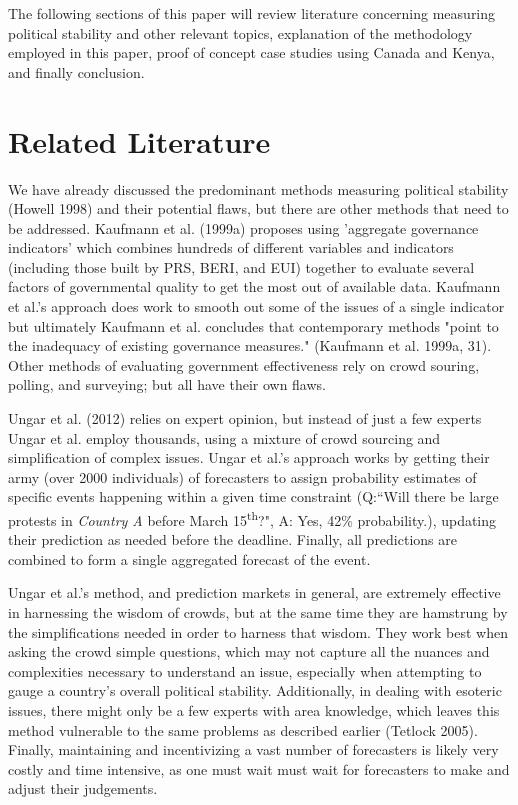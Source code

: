\documentclass[12pt]{article}
\begin{document}
\begin{spacing}{1.5}
The following sections of this paper will review literature concerning measuring political stability and other relevant topics, explanation of the methodology employed in this paper, proof of concept case studies using Canada and Kenya, and finally conclusion. 

\section*{Related Literature}   

We have already discussed the predominant methods measuring political stability (Howell 1998) and their potential flaws, but there are other methods that need to be addressed. Kaufmann et al. (1999a) proposes using 'aggregate governance indicators' which combines hundreds of different variables and indicators (including those built by PRS, BERI, and EUI) together to evaluate several factors of governmental quality to get the most out of available data. Kaufmann et al.'s approach does work to smooth out some of the issues of a single indicator but ultimately Kaufmann et al. concludes that contemporary methods "point to the inadequacy of existing governance measures." (Kaufmann et al. 1999a, 31). Other methods of evaluating government effectiveness rely on crowd souring, polling, and surveying; but all have their own flaws. 


Ungar et al. (2012) relies on expert opinion, but instead of just a few experts Ungar et al. employ thousands, using a mixture of crowd sourcing and simplification of complex issues. Ungar et al.'s approach works by getting their army (over 2000 individuals) of forecasters to assign probability estimates of specific events happening within a given time constraint (Q:``Will there be large protests in \textit{Country A} before March 15\textsuperscript{th}?", A: Yes, 42\% probability.), updating their prediction as needed before the deadline. Finally, all predictions are combined to form a single aggregated forecast of the event. 

Ungar et al.'s method, and prediction markets in general, are extremely effective in harnessing the wisdom of crowds, but at the same time they are hamstrung by the simplifications needed in order to harness that wisdom. They work best when asking the crowd simple questions, which may not capture all the nuances and complexities necessary to understand an issue, especially when attempting to gauge a country's overall political stability. Additionally, in dealing with esoteric issues, there might only be a few experts with area knowledge, which leaves this method vulnerable to the same problems as described earlier (Tetlock 2005). Finally, maintaining and incentivizing a vast number of forecasters is likely very costly and time intensive, as one must wait must wait for forecasters to make and adjust their judgements. 


\end{spacing}
\end{document}
